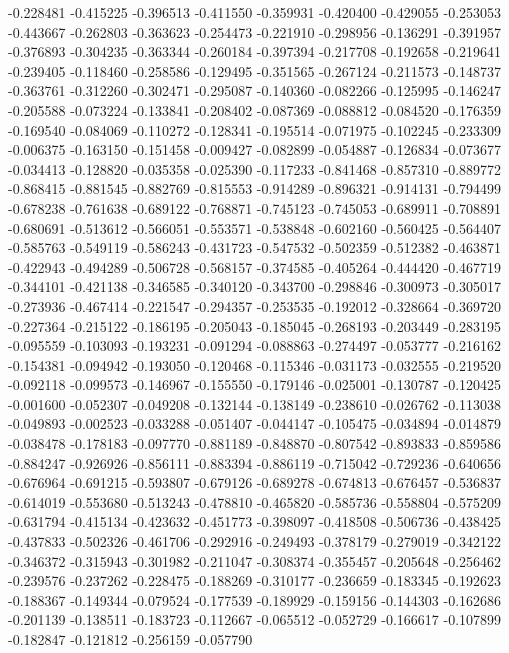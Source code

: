 -0.228481
-0.415225
-0.396513
-0.411550
-0.359931
-0.420400
-0.429055
-0.253053
-0.443667
-0.262803
-0.363623
-0.254473
-0.221910
-0.298956
-0.136291
-0.391957
-0.376893
-0.304235
-0.363344
-0.260184
-0.397394
-0.217708
-0.192658
-0.219641
-0.239405
-0.118460
-0.258586
-0.129495
-0.351565
-0.267124
-0.211573
-0.148737
-0.363761
-0.312260
-0.302471
-0.295087
-0.140360
-0.082266
-0.125995
-0.146247
-0.205588
-0.073224
-0.133841
-0.208402
-0.087369
-0.088812
-0.084520
-0.176359
-0.169540
-0.084069
-0.110272
-0.128341
-0.195514
-0.071975
-0.102245
-0.233309
-0.006375
-0.163150
-0.151458
-0.009427
-0.082899
-0.054887
-0.126834
-0.073677
-0.034413
-0.128820
-0.035358
-0.025390
-0.117233
-0.841468
-0.857310
-0.889772
-0.868415
-0.881545
-0.882769
-0.815553
-0.914289
-0.896321
-0.914131
-0.794499
-0.678238
-0.761638
-0.689122
-0.768871
-0.745123
-0.745053
-0.689911
-0.708891
-0.680691
-0.513612
-0.566051
-0.553571
-0.538848
-0.602160
-0.560425
-0.564407
-0.585763
-0.549119
-0.586243
-0.431723
-0.547532
-0.502359
-0.512382
-0.463871
-0.422943
-0.494289
-0.506728
-0.568157
-0.374585
-0.405264
-0.444420
-0.467719
-0.344101
-0.421138
-0.346585
-0.340120
-0.343700
-0.298846
-0.300973
-0.305017
-0.273936
-0.467414
-0.221547
-0.294357
-0.253535
-0.192012
-0.328664
-0.369720
-0.227364
-0.215122
-0.186195
-0.205043
-0.185045
-0.268193
-0.203449
-0.283195
-0.095559
-0.103093
-0.193231
-0.091294
-0.088863
-0.274497
-0.053777
-0.216162
-0.154381
-0.094942
-0.193050
-0.120468
-0.115346
-0.031173
-0.032555
-0.219520
-0.092118
-0.099573
-0.146967
-0.155550
-0.179146
-0.025001
-0.130787
-0.120425
-0.001600
-0.052307
-0.049208
-0.132144
-0.138149
-0.238610
-0.026762
-0.113038
-0.049893
-0.002523
-0.033288
-0.051407
-0.044147
-0.105475
-0.034894
-0.014879
-0.038478
-0.178183
-0.097770
-0.881189
-0.848870
-0.807542
-0.893833
-0.859586
-0.884247
-0.926926
-0.856111
-0.883394
-0.886119
-0.715042
-0.729236
-0.640656
-0.676964
-0.691215
-0.593807
-0.679126
-0.689278
-0.674813
-0.676457
-0.536837
-0.614019
-0.553680
-0.513243
-0.478810
-0.465820
-0.585736
-0.558804
-0.575209
-0.631794
-0.415134
-0.423632
-0.451773
-0.398097
-0.418508
-0.506736
-0.438425
-0.437833
-0.502326
-0.461706
-0.292916
-0.249493
-0.378179
-0.279019
-0.342122
-0.346372
-0.315943
-0.301982
-0.211047
-0.308374
-0.355457
-0.205648
-0.256462
-0.239576
-0.237262
-0.228475
-0.188269
-0.310177
-0.236659
-0.183345
-0.192623
-0.188367
-0.149344
-0.079524
-0.177539
-0.189929
-0.159156
-0.144303
-0.162686
-0.201139
-0.138511
-0.183723
-0.112667
-0.065512
-0.052729
-0.166617
-0.107899
-0.182847
-0.121812
-0.256159
-0.057790
